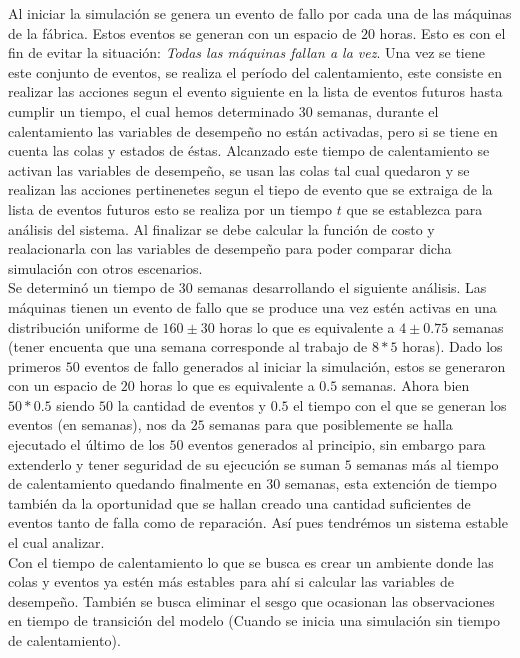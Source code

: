 \documentclass[10pt]{article}
\begin{document}
Al iniciar la simulación se genera un evento de fallo por cada una de las máquinas de la fábrica. Estos eventos se generan con un  espacio de $20$ horas. Esto es con el fin de evitar la situación: \emph{Todas las máquinas fallan a la vez}. Una vez se tiene este conjunto de eventos, se realiza el período del calentamiento, este consiste en realizar las acciones segun el evento siguiente en la lista de eventos futuros hasta cumplir un tiempo, el cual hemos determinado 30 semanas, durante el calentamiento las variables de desempeño no están activadas, pero si se tiene en cuenta las colas y estados de éstas. Alcanzado este tiempo de calentamiento se activan las variables de desempeño, se usan las colas tal cual quedaron y se realizan las acciones pertinenetes segun el tiepo de evento que se extraiga de la lista de eventos futuros esto se realiza por un tiempo $t$ que se establezca para análisis del sistema. Al finalizar se debe calcular la función de costo y realacionarla con las variables de desempeño para poder comparar dicha simulación con otros escenarios.\\

Se determinó un tiempo de 30 semanas desarrollando el siguiente análisis. Las máquinas tienen un evento de fallo que se produce una vez estén activas en una distribución uniforme de $160\pm30$ horas lo que es equivalente a $4\pm0.75$ semanas (tener encuenta que una semana corresponde al trabajo de $8*5$  horas). Dado los primeros $50$ eventos de fallo generados al iniciar la simulación, estos se generaron con un espacio de $20$ horas lo que es equivalente a $0.5$ semanas. Ahora bien $50*0.5$ siendo $50$ la cantidad de eventos y $0.5$ el tiempo con el que se generan los eventos (en semanas), nos da $25$ semanas para que posiblemente se halla ejecutado el último de los $50$ eventos generados al principio, sin embargo para extenderlo y tener seguridad de su ejecución se suman $5$ semanas más al tiempo de calentamiento quedando finalmente en $30$ semanas, esta extención de tiempo también da la oportunidad que se hallan creado una cantidad suficientes de eventos tanto de falla como de reparación. Así pues tendrémos un sistema estable el cual analizar.\\



Con el tiempo de calentamiento lo que se busca es crear un ambiente donde las colas y eventos ya estén más estables para ahí si calcular las variables de desempeño. También se busca eliminar el sesgo que ocasionan las observaciones en tiempo de transición del modelo (Cuando se inicia una simulación sin tiempo de calentamiento). \\
\end{document}
